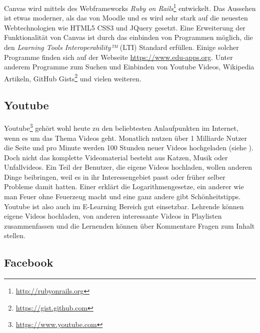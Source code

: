 
Canvas wird mittels des Webframeworks \emph{Ruby on Rails}\footnote{\url{http://rubyonrails.org}} entwickelt. Das Aussehen ist etwas moderner, als das von Moodle und es wird sehr stark auf die neuesten Webtechnologien wie HTML5 CSS3 und JQuery gesetzt. Eine Erweiterung der Funktionalität von Canvas ist durch das einbinden von Programmen möglich, die den \emph{Learning Tools Interoperability™} (LTI) Standard erfüllen. Einige solcher Programme finden sich auf der Webseite \url{https://www.edu-apps.org}. Unter anderem Programme zum Suchen und Einbinden von Youtube Videos, Wikipedia Artikeln, GitHub Gists\footnote{\url{https://gist.github.com}} und vielen weiteren.


\subsection{Youtube} %
\label{sub:youtube}

Youtube\footnote{\url{https://www.youtube.com}} gehört wohl heute zu den beliebtesten Anlaufpunkten im Internet, wenn es um das Thema Videos geht. Monatlich nutzen über 1 Milliarde Nutzer die Seite und pro Minute werden 100 Stunden neuer Videos hochgeladen (siehe \cite{youtube2013statistics}). Doch nicht das komplette Videomaterial besteht aus Katzen, Musik oder Unfallvideos. Ein Teil der Benutzer, die eigene Videos hochladen, wollen anderen Dinge beibringen, weil es in ihr Interessengebiet passt oder früher selber Probleme damit hatten. Einer erklärt die Logarithmengesetze, ein anderer wie man Feuer ohne Feuerzeug macht und eine ganz andere gibt Schönheitstipps. Youtube ist also auch im E-Learning Bereich gut einsetzbar. Lehrende können eigene Videos hochladen, von anderen interessante Videos in Playlisten zusammenfassen und die Lernenden können über Kommentare Fragen zum Inhalt stellen. 


\subsection{Facebook} %
\label{sub:facebook}

